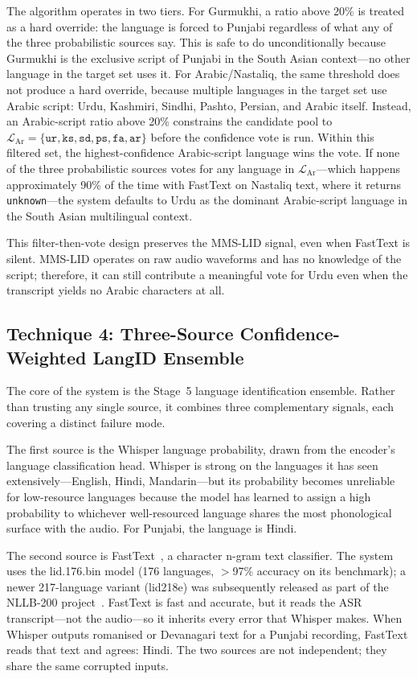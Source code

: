 \documentclass[12pt, onecolumn]{IEEEtran}
\begin{document}
The algorithm operates in two tiers. For Gurmukhi, a ratio above 20\% is treated as a hard override: the language is forced to Punjabi regardless of what any of the three probabilistic sources say. This is safe to do unconditionally because Gurmukhi is the exclusive script of Punjabi in the South Asian context---no other language in the target set uses it. For Arabic/Nastaliq, the same threshold does not produce a hard override, because multiple languages in the target set use Arabic script: Urdu, Kashmiri, Sindhi, Pashto, Persian, and Arabic itself. Instead, an Arabic-script ratio above 20\% constrains the candidate pool to $\mathcal{L}_{\text{Ar}} = \{\texttt{ur}, \texttt{ks}, \texttt{sd}, \texttt{ps}, \texttt{fa}, \texttt{ar}\}$ before the confidence vote is run. Within this filtered set, the highest-confidence Arabic-script language wins the vote. If none of the three probabilistic sources votes for any language in $\mathcal{L}_{\text{Ar}}$---which happens approximately 90\% of the time with FastText on Nastaliq text, where it returns \texttt{unknown}---the system defaults to Urdu as the dominant Arabic-script language in the South Asian multilingual context.

This filter-then-vote design preserves the MMS-LID signal, even when FastText is silent. MMS-LID operates on raw audio waveforms and has no knowledge of the script; therefore, it can still contribute a meaningful vote for Urdu even when the transcript yields no Arabic characters at all.

\subsection{Technique 4: Three-Source Confidence-Weighted LangID Ensemble}

The core of the system is the Stage~5 language identification ensemble. Rather than trusting any single source, it combines three complementary signals, each covering a distinct failure mode.

The first source is the Whisper language probability, drawn from the encoder's language classification head. Whisper is strong on the languages it has seen extensively---English, Hindi, Mandarin---but its probability becomes unreliable for low-resource languages because the model has learned to assign a high probability to whichever well-resourced language shares the most phonological surface with the audio. For Punjabi, the language is Hindi.

The second source is FastText~\cite{joulin2017bag}, a character n-gram text classifier. The system uses the lid.176.bin model (176 languages, $>$97\% accuracy on its benchmark); a newer 217-language variant (lid218e) was subsequently released as part of the NLLB-200 project~\cite{costajussa2024nllb}. FastText is fast and accurate, but it reads the ASR transcript---not the audio---so it inherits every error that Whisper makes. When Whisper outputs romanised or Devanagari text for a Punjabi recording, FastText reads that text and agrees: Hindi. The two sources are not independent; they share the same corrupted inputs.
\end{document}
